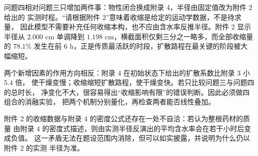问题四相对问题三只增加两件事：物性闭合换成附录 4，半径由固定值改为附件 2 给出的
实测时程。“请根据附件 2”意味着收缩是给定的运动学数据，不是待求量，
因此模型不需要补充任何收缩本构，也不应由含水率反推半径。附件 2 显示半径从
$2.000$ cm 单调降到 $1.198$ cm，横截面积仅剩三分之一略多，而全部收缩量的
$78.1\%$ 发生在前 $6$ h，正是传质最活跃的时段，扩散路程在最关键的阶段被大幅缩短。

两个新增因素的作用方向相反：附录 4 在初始状态下给出的扩散系数比附录 3 小 $5.4$ 倍，
使干燥变慢；收缩缩短扩散路程，使干燥变快。若只比较问题三与问题四的总时长，
净变化不大，很容易得出“收缩影响有限”的错误判断。因此必须做四组合的消融实验，
把两个机制分别量化，再检查两者能否线性叠加。

附件 2 的收缩数据与附录 4 的密度公式还存在一处不自洽：若认为整根药材的质量
由附录 4 的密度式描述，则由实测半径反演出的平均含水率会在若干小时后变成负值。
这一矛盾无法在题设范围内消除，但可以如实披露，并说明为什么仍以附件 2 的实测
半径为准。
